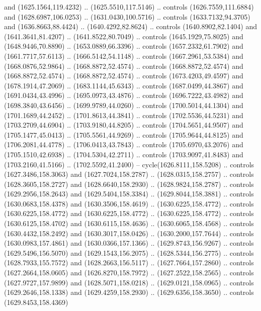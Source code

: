 \begin{scope}[shift={(-22.88722,-49.76189)}]
\begin{scope}[shift={(-739.46591,328.36782)}]
      and (1625.1564,119.4232) .. (1625.5510,117.5146) .. controls
      (1626.7559,111.6884) and (1628.6987,106.0253) .. (1631.0430,100.5716) ..
      controls (1633.7132,94.3705) and (1636.8663,88.4424) .. (1640.4292,82.8624) ..
      controls (1640.8902,82.1404) and (1641.3641,81.4207) .. (1641.8522,80.7049) ..
      controls (1645.1929,75.8025) and (1648.9446,70.8890) .. (1653.0889,66.3396) ..
      controls (1657.2332,61.7902) and (1661.7717,57.6113) .. (1666.5142,54.1148) ..
      controls (1667.2961,53.5384) and (1668.0876,52.9864) .. (1668.8872,52.4574) ..
      controls (1668.8872,52.4574) and (1668.8872,52.4574) .. (1668.8872,52.4574) ..
      controls (1673.4203,49.4597) and (1678.1914,47.2069) .. (1683.1144,45.6343) ..
      controls (1687.0499,44.3867) and (1691.0434,43.4996) .. (1695.0973,43.4876) ..
      controls (1696.7222,43.4982) and (1698.3840,43.6456) .. (1699.9789,44.0260) ..
      controls (1700.5014,44.1304) and (1701.1689,44.2452) .. (1701.8613,44.3841) ..
      controls (1702.5536,44.5231) and (1703.2709,44.6904) .. (1703.9180,44.8205) ..
      controls (1704.5651,44.9507) and (1705.1477,45.0413) .. (1705.5561,44.9269) ..
      controls (1705.9644,44.8125) and (1706.2081,44.4778) .. (1706.0413,43.7843) ..
      controls (1705.6970,43.2076) and (1705.1510,42.6938) .. (1704.5304,42.2711) ..
      controls (1703.9097,41.8483) and (1703.2160,41.5166) .. (1702.5592,41.2400) --
      cycle(1626.8111,158.5208) .. controls (1627.3486,158.3063) and
      (1627.7024,158.2787) .. (1628.0315,158.2757) .. controls (1628.3605,158.2727)
      and (1628.6640,158.2930) .. (1628.9824,158.2787) .. controls
      (1629.2956,158.2643) and (1629.5404,158.3384) .. (1629.8044,158.3881) ..
      controls (1630.0683,158.4378) and (1630.3506,158.4619) .. (1630.6225,158.4772)
      .. controls (1630.6225,158.4772) and (1630.6225,158.4772) ..
      (1630.6225,158.4772) .. controls (1630.6125,158.4702) and (1630.6115,158.4636)
      .. (1630.6065,158.4568) .. controls (1630.4432,158.2492) and
      (1630.3017,158.0426) .. (1630.2000,157.7644) .. controls (1630.0983,157.4861)
      and (1630.0366,157.1366) .. (1629.8743,156.9267) .. controls
      (1629.5496,156.5070) and (1629.1543,156.2075) .. (1628.5344,156.2775) ..
      controls (1628.7933,155.7572) and (1628.2663,156.5117) .. (1627.7664,157.2860)
      .. controls (1627.2664,158.0605) and (1626.8270,158.7972) ..
      (1627.2522,158.2565) .. controls (1627.9727,157.9899) and (1628.5071,158.0218)
      .. (1629.0121,158.0965) .. controls (1629.2646,158.1338) and
      (1629.4259,158.2930) .. (1629.6356,158.3650) .. controls (1629.8453,158.4369)

\end{scope}
\end{scope}
